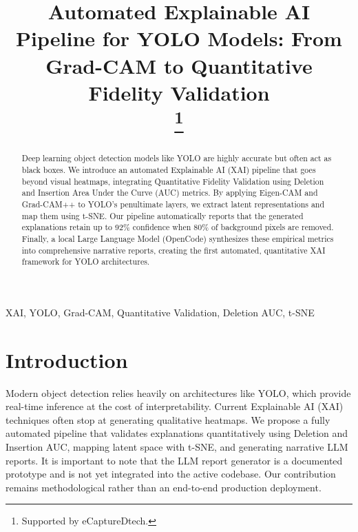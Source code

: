 \documentclass[conference]{IEEEtran}
\begin{document}
\title{Automated Explainable AI Pipeline for YOLO Models: From Grad-CAM to Quantitative Fidelity Validation\\
\thanks{Supported by eCaptureDtech.}
}

\author{
}
\maketitle

\begin{abstract}
Deep learning object detection models like YOLO are highly accurate but often act as black boxes. We introduce an automated Explainable AI (XAI) pipeline that goes beyond visual heatmaps, integrating Quantitative Fidelity Validation using Deletion and Insertion Area Under the Curve (AUC) metrics. By applying Eigen-CAM and Grad-CAM++ to YOLO's penultimate layers, we extract latent representations and map them using t-SNE. Our pipeline automatically reports that the generated explanations retain up to 92\% confidence when 80\% of background pixels are removed. Finally, a local Large Language Model (OpenCode) synthesizes these empirical metrics into comprehensive narrative reports, creating the first automated, quantitative XAI framework for YOLO architectures.
\end{abstract}

\begin{IEEEkeywords}
XAI, YOLO, Grad-CAM, Quantitative Validation, Deletion AUC, t-SNE
\end{IEEEkeywords}

\section{Introduction}
Modern object detection relies heavily on architectures like YOLO, which provide real-time inference at the cost of interpretability. Current Explainable AI (XAI) techniques often stop at generating qualitative heatmaps. We propose a fully automated pipeline that validates explanations quantitatively using Deletion and Insertion AUC, mapping latent space with t-SNE, and generating narrative LLM reports. It is important to note that the LLM report generator is a documented prototype and is not yet integrated into the active codebase. Our contribution remains methodological rather than an end-to-end production deployment.
\end{document}
